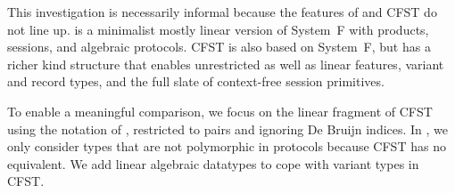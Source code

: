 This investigation is necessarily informal because the features of
\algst and CFST do not line up. \algst is a minimalist mostly linear
version of System~F with products, sessions, and algebraic
protocols. CFST is also based on System~F, but has a richer kind
structure that enables unrestricted as well as linear features,
variant and record types, and the full slate of context-free session
primitives.

To enable a meaningful comparison,  we focus on the linear fragment of
CFST~\cite{DBLP:journals/corr/abs-2106-06658}
using the notation of \citet{DBLP:journals/corr/abs-2203-12877},
restricted to pairs and ignoring De Bruijn indices.
In \algst, we only consider types that are not polymorphic in
protocols because CFST has no equivalent. We add linear algebraic
datatypes to cope with variant types in CFST.



%

